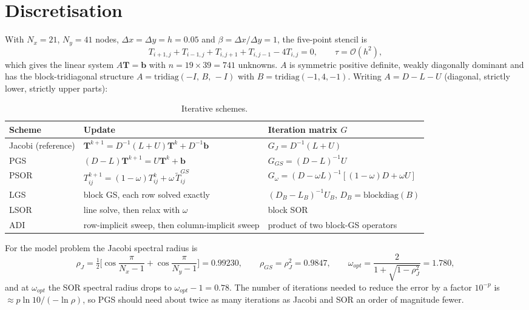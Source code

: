 \section{Discretisation}
With $N_x=21$, $N_y=41$ nodes, $\Delta x=\Delta y=h=0.05$ and $\beta=\Delta x/\Delta y=1$, the five-point stencil is
\begin{equation}
T_{i+1,j}+T_{i-1,j}+T_{i,j+1}+T_{i,j-1}-4T_{i,j}=0,\qquad \tau=\mathcal{O}(h^2), \label{eq:5pt}
\end{equation}
which gives the linear system $A\mathbf{T}=\mathbf{b}$ with $n=19\times39=741$ unknowns. $A$ is symmetric positive definite, weakly diagonally dominant and has the block-tridiagonal structure $A=\mathrm{tridiag}(-I,\,B,\,-I)$ with $B=\mathrm{tridiag}(-1,4,-1)$. Writing $A=D-L-U$ (diagonal, strictly lower, strictly upper parts):
\begin{table}[H]\centering\small
\begin{tabular}{lll}\toprule
Scheme & Update & Iteration matrix $G$\\\midrule
Jacobi (reference) & $\mathbf{T}^{k+1}=D^{-1}(L+U)\mathbf{T}^k+D^{-1}\mathbf{b}$ & $G_J=D^{-1}(L+U)$\\
PGS & $(D-L)\mathbf{T}^{k+1}=U\mathbf{T}^k+\mathbf{b}$ & $G_{GS}=(D-L)^{-1}U$\\
PSOR & $T^{k+1}_{ij}=(1-\omega)T^k_{ij}+\omega\,\tilde T^{GS}_{ij}$ & $G_\omega=(D-\omega L)^{-1}[(1-\omega)D+\omega U]$\\
LGS & block GS, each row solved exactly & $(D_B-L_B)^{-1}U_B$, $D_B=\mathrm{blockdiag}(B)$\\
LSOR & line solve, then relax with $\omega$ & block SOR\\
ADI & row-implicit sweep, then column-implicit sweep & product of two block-GS operators\\\bottomrule
\end{tabular}\caption{Iterative schemes.}\end{table}
For the model problem the Jacobi spectral radius is
\begin{equation}\rho_J=\tfrac12\Big[\cos\frac{\pi}{N_x-1}+\cos\frac{\pi}{N_y-1}\Big]=0.99230,\qquad \rho_{GS}=\rho_J^2=0.9847,\qquad \omega_{opt}=\frac{2}{1+\sqrt{1-\rho_J^2}}=1.780,\end{equation}
and at $\omega_{opt}$ the SOR spectral radius drops to $\omega_{opt}-1=0.78$. The number of iterations needed to reduce the error by a factor $10^{-p}$ is $\approx p\ln10/(-\ln\rho)$, so PGS should need about twice as many iterations as Jacobi and SOR an order of magnitude fewer.

